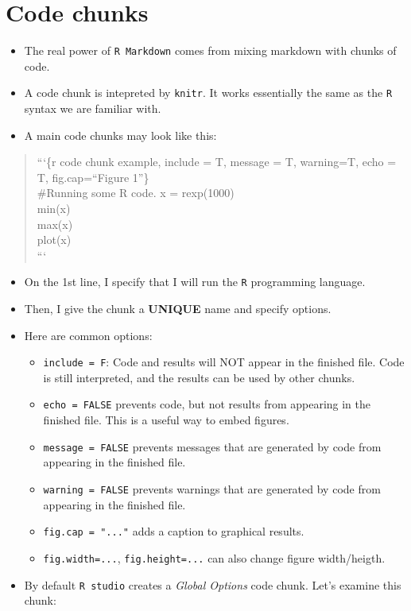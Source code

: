 \documentclass[]{article}
\begin{document}
\hypertarget{code-chunks}{%
\section{Code chunks}\label{code-chunks}}

\begin{itemize}
\item
  The real power of \texttt{R\ Markdown} comes from mixing markdown with
  chunks of code.
\item
  A code chunk is intepreted by \texttt{knitr}. It works essentially the
  same as the \texttt{R} syntax we are familiar with.
\item
  A main code chunks may look like this:
\end{itemize}

\begin{quote}
```\{r code chunk example, include = T, message = T, warning=T, echo =
T, fig.cap=``Figure 1''\}\\
\#Running some R code. x = rexp(1000)\\
min(x)\\
max(x)\\
plot(x)\\
```
\end{quote}

\begin{itemize}
\item
  On the 1st line, I specify that I will run the \texttt{R} programming
  language.
\item
  Then, I give the chunk a \textbf{UNIQUE} name and specify options.
\item
  Here are common options:

  \begin{itemize}
  \item
    \texttt{include\ =\ F}: Code and results will NOT appear in the
    finished file. Code is still interpreted, and the results can be
    used by other chunks.
  \item
    \texttt{echo\ =\ FALSE} prevents code, but not results from
    appearing in the finished file. This is a useful way to embed
    figures.
  \item
    \texttt{message\ =\ FALSE} prevents messages that are generated by
    code from appearing in the finished file.
  \item
    \texttt{warning\ =\ FALSE} prevents warnings that are generated by
    code from appearing in the finished file.
  \item
    \texttt{fig.cap\ =\ "..."} adds a caption to graphical results.
  \item
    \texttt{fig.width=...}, \texttt{fig.height=...} can also change
    figure width/heigth.
  \end{itemize}
\item
  By default \texttt{R\ studio} creates a \emph{Global Options} code
  chunk. Let's examine this chunk:
\end{itemize}
\end{document}
